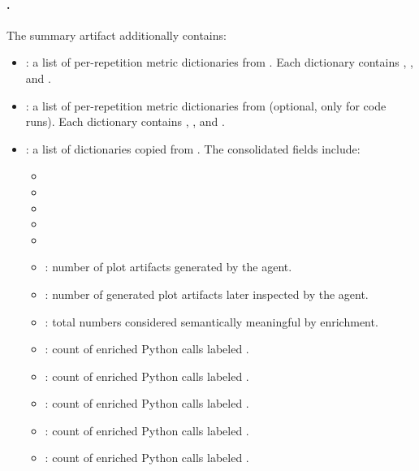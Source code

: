 \documentclass[11pt]{article}
\begin{document}
\paragraph{\texorpdfstring{}{<row\_slug>\_summary.json}.}
The summary artifact additionally contains:
\begin{itemize}
  \item {}: a list of per-repetition metric dictionaries from .
  Each dictionary contains , , and .
  \item {}: a list of per-repetition metric dictionaries from  (optional, only for code runs).
  Each dictionary contains , , and .
  \item {}: a list of dictionaries copied from . The consolidated fields include:
  \begin{itemize}
    \item {}
    \item {}
    \item {}
    \item {}
    \item {}
    \item {}: number of plot artifacts generated by the agent.
    \item {}: number of generated plot artifacts later inspected by the agent.
    \item {}: total numbers considered semantically meaningful by  enrichment.
    \item {}: count of enriched Python calls labeled .
    \item {}: count of enriched Python calls labeled .
    \item {}: count of enriched Python calls labeled .
    \item {}: count of enriched Python calls labeled .
    \item {}: count of enriched Python calls labeled .

\end{itemize}
\end{itemize}
\end{document}

